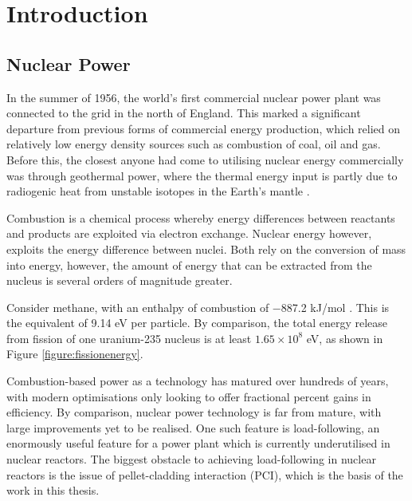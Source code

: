 \chapter{Introduction} \label{introduction}

\section{Nuclear Power} %

In the summer of 1956, the world's first commercial nuclear power plant was connected to the grid in the north of England. This marked a significant departure from previous forms of commercial energy production, which relied on relatively low energy density sources such as combustion of coal, oil and gas. Before this, the closest anyone had come to utilising nuclear energy commercially was through geothermal power, where the thermal energy input is partly due to radiogenic heat from unstable isotopes in the Earth's mantle \cite{gando2011partial}. 

Combustion is a chemical process whereby energy differences between reactants and products are exploited via electron exchange. Nuclear energy however, exploits the energy difference between nuclei. Both rely on the conversion of mass into energy, however, the amount of energy that can be extracted from the nucleus is several orders of magnitude greater.

Consider methane, with an enthalpy of combustion of −887.2 kJ/mol \cite{thornton1917xv}. This is the equivalent of 9.14 eV per particle. By comparison, the total energy release from fission of one uranium-235 nucleus is at least $1.65 \times 10^{8}$ eV, as shown in Figure \ref{figure:fissionenergy}.

Combustion-based power as a technology has matured over hundreds of years, with modern optimisations only looking to offer fractional percent gains in efficiency. By comparison, nuclear power technology is far from mature, with large improvements yet to be realised. One such feature is load-following, an enormously useful feature for a power plant which is currently underutilised in nuclear reactors. The biggest obstacle to achieving load-following in nuclear reactors is the issue of pellet-cladding interaction (PCI), which is the basis of the work in this thesis.

